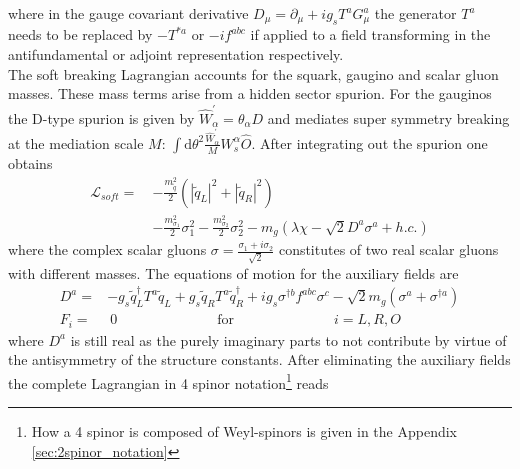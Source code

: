 where in the gauge covariant derivative $D_\mu = \partial_\mu +ig_sT^aG^a_\mu$ the generator $T^a$ needs to be replaced by $-T^{\ast a}$ or $-if^{abc}$ if applied to a field transforming in the antifundamental or adjoint representation respectively.\\
The soft breaking Lagrangian accounts for the squark, gaugino and scalar gluon masses. These mass terms arise from a hidden sector spurion. For the gauginos the D-type spurion is given by $\hat{W}_\alpha^\prime = \theta_\alpha D$ and mediates super symmetry breaking at the mediation scale $M$: $\int\mathrm{d}\theta^2\frac{\hat{W}_\alpha^\prime}{M}W_s^\alpha \hat{O}$. After integrating out the spurion one obtains
\begin{align}
\mathcal{L}_{soft} =\ & -\frac{m_{\tilde{q}}^2}{2}(|\tilde{q}_L|^2 + |\tilde{q}_R|^2)\nonumber\\
& -\frac{m_{\sigma_1}^2}{2}\sigma_1^2 -\frac{m_{\sigma_2}^2}{2}\sigma_2^2 - m_g(\lambda\chi -\sqrt{2}D^a \sigma^a + h.c.)
\end{align}
where the complex scalar gluons $\sigma = \frac{\sigma_1 + i\sigma_2}{\sqrt{2}}$ constitutes of two real scalar gluons with different masses.
The equations of motion for the auxiliary fields are
\begin{align}
D^a =& -g_s \tilde{q}_L^\dagger T^a \tilde{q}_L + g_s \tilde{q}_R T^a \tilde{q}_R^\dagger + ig_s\sigma^{\dagger b}f^{abc}\sigma^c -\sqrt{2}m_g(\sigma^a + \sigma^{\dagger a})\\
F_i =&\ 0 \hspace{3cm} \mathrm{for} \hspace{3cm} i = L,R,O
\end{align}
where $D^a$ is still real as the purely imaginary parts to not contribute by virtue of the antisymmetry of the structure constants. After eliminating the auxiliary fields the complete Lagrangian in 4 spinor notation\footnote{How a 4 spinor is composed of Weyl-spinors is given in the Appendix \ref{sec:2spinor_notation}} reads
